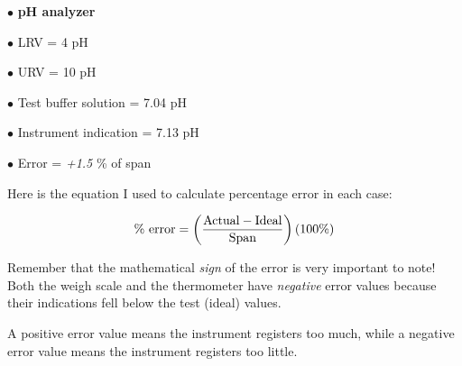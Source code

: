 \vskip 10pt

\medskip
\item{$\bullet$} {\bf pH analyzer}
\item{$\bullet$} LRV = 4 pH
\item{$\bullet$} URV = 10 pH
\item{$\bullet$} Test buffer solution = 7.04 pH
\item{$\bullet$} Instrument indication = 7.13 pH
\item{$\bullet$} Error = {\it +1.5} \% of span
\medskip







Here is the equation I used to calculate percentage error in each case:

$$\hbox{\% error} = \left({\hbox{Actual} - \hbox{Ideal} \over \hbox{Span}}\right) (100 \%)$$

Remember that the mathematical {\it sign} of the error is very important to note!  Both the weigh scale and the thermometer have {\it negative} error values because their indications fell below the test (ideal) values.

A positive error value means the instrument registers too much, while a negative error value means the instrument registers too little.




